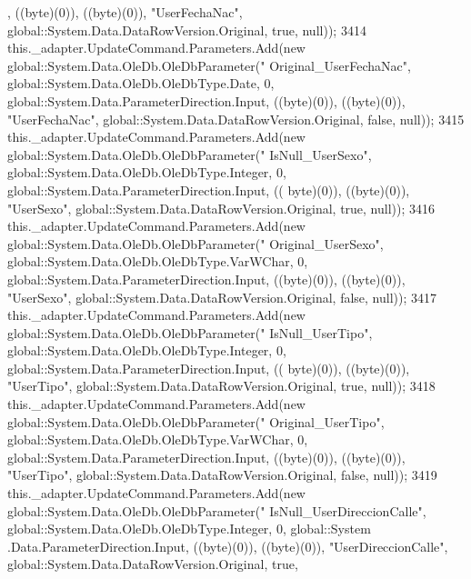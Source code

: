 \begin{DoxyCode}
      , ((byte)(0)), ((byte)(0)), \textcolor{stringliteral}{"UserFechaNac"}, global::System.Data.DataRowVersion.Original, \textcolor{keyword}{true}, null));
3414             this.\_adapter.UpdateCommand.Parameters.Add(\textcolor{keyword}{new} global::System.Data.OleDb.OleDbParameter(\textcolor{stringliteral}{"
      Original\_UserFechaNac"}, global::System.Data.OleDb.OleDbType.Date, 0, global::System.Data.ParameterDirection.Input,
       ((byte)(0)), ((byte)(0)), \textcolor{stringliteral}{"UserFechaNac"}, global::System.Data.DataRowVersion.Original, \textcolor{keyword}{false}, null));
3415             this.\_adapter.UpdateCommand.Parameters.Add(\textcolor{keyword}{new} global::System.Data.OleDb.OleDbParameter(\textcolor{stringliteral}{"
      IsNull\_UserSexo"}, global::System.Data.OleDb.OleDbType.Integer, 0, global::System.Data.ParameterDirection.Input, ((
      byte)(0)), ((byte)(0)), \textcolor{stringliteral}{"UserSexo"}, global::System.Data.DataRowVersion.Original, \textcolor{keyword}{true}, null));
3416             this.\_adapter.UpdateCommand.Parameters.Add(\textcolor{keyword}{new} global::System.Data.OleDb.OleDbParameter(\textcolor{stringliteral}{"
      Original\_UserSexo"}, global::System.Data.OleDb.OleDbType.VarWChar, 0, global::System.Data.ParameterDirection.Input,
       ((byte)(0)), ((byte)(0)), \textcolor{stringliteral}{"UserSexo"}, global::System.Data.DataRowVersion.Original, \textcolor{keyword}{false}, null));
3417             this.\_adapter.UpdateCommand.Parameters.Add(\textcolor{keyword}{new} global::System.Data.OleDb.OleDbParameter(\textcolor{stringliteral}{"
      IsNull\_UserTipo"}, global::System.Data.OleDb.OleDbType.Integer, 0, global::System.Data.ParameterDirection.Input, ((
      byte)(0)), ((byte)(0)), \textcolor{stringliteral}{"UserTipo"}, global::System.Data.DataRowVersion.Original, \textcolor{keyword}{true}, null));
3418             this.\_adapter.UpdateCommand.Parameters.Add(\textcolor{keyword}{new} global::System.Data.OleDb.OleDbParameter(\textcolor{stringliteral}{"
      Original\_UserTipo"}, global::System.Data.OleDb.OleDbType.VarWChar, 0, global::System.Data.ParameterDirection.Input,
       ((byte)(0)), ((byte)(0)), \textcolor{stringliteral}{"UserTipo"}, global::System.Data.DataRowVersion.Original, \textcolor{keyword}{false}, null));
3419             this.\_adapter.UpdateCommand.Parameters.Add(\textcolor{keyword}{new} global::System.Data.OleDb.OleDbParameter(\textcolor{stringliteral}{"
      IsNull\_UserDireccionCalle"}, global::System.Data.OleDb.OleDbType.Integer, 0, global::System
      .Data.ParameterDirection.Input, ((byte)(0)), ((byte)(0)), \textcolor{stringliteral}{"UserDireccionCalle"}, global::System.Data.DataRowVersion.Original, \textcolor{keyword}{true}, 

\end{DoxyCode}
